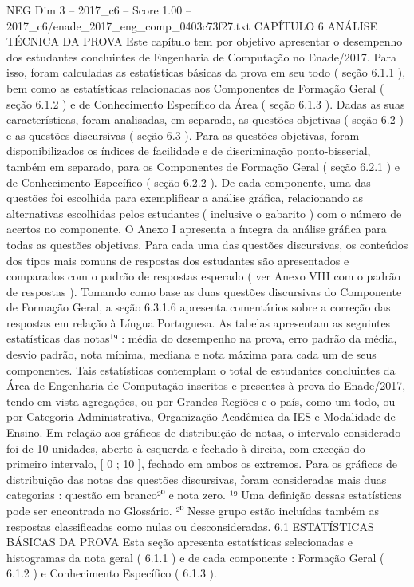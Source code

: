 \begin{textsample}{NEG Dim 3 – 2017\_c6 – Score 1.00 – 2017\_c6/enade\_2017\_eng\_comp\_0403c73f27.txt}  \label{ex:f3_neg_088}
CAPÍTULO 6 ANÁLISE TÉCNICA DA PROVA Este capítulo tem por objetivo apresentar o desempenho dos estudantes concluintes de Engenharia de Computação no Enade/2017.
Para isso, foram calculadas as estatísticas básicas da prova em seu todo ( seção 6.1.1 ), bem como as estatísticas relacionadas aos Componentes de Formação Geral ( seção 6.1.2 ) e de Conhecimento Específico da Área ( seção 6.1.3 ).
Dadas as suas características, foram analisadas, em separado, as questões objetivas ( seção 6.2 ) e as questões discursivas ( seção 6.3 ).
Para as questões objetivas, foram disponibilizados os índices de facilidade e de discriminação ponto-bisserial, também em separado, para os Componentes de Formação Geral ( seção 6.2.1 ) e de Conhecimento Específico ( seção 6.2.2 ).
De cada componente, uma das questões foi escolhida para exemplificar a análise gráfica, relacionando as alternativas escolhidas pelos estudantes ( inclusive o gabarito ) com o número de acertos no componente.
O Anexo I apresenta a íntegra da análise gráfica para todas as questões objetivas.
Para cada uma das questões discursivas, os conteúdos dos tipos mais comuns de respostas dos estudantes são apresentados e comparados com o padrão de respostas esperado ( ver Anexo VIII com o padrão de respostas ).
Tomando como base as duas questões discursivas do Componente de Formação Geral, a seção 6.3.1.6 apresenta comentários sobre a correção das respostas em relação à Língua Portuguesa.
As tabelas apresentam as seguintes estatísticas das notas¹⁹ : média do desempenho na prova, erro padrão da média, desvio padrão, nota mínima, mediana e nota máxima para cada um de seus componentes.
Tais estatísticas contemplam o total de estudantes concluintes da Área de Engenharia de Computação inscritos e presentes à prova do Enade/2017, tendo em vista agregações, ou por Grandes Regiões e o país, como um todo, ou por Categoria Administrativa, Organização Acadêmica da IES e Modalidade de Ensino.
Em relação aos gráficos de distribuição de notas, o intervalo considerado foi de 10 unidades, aberto à esquerda e fechado à direita, com exceção do primeiro intervalo, [ 0 ; 10 ], fechado em ambos os extremos.
Para os gráficos de distribuição das notas das questões discursivas, foram consideradas mais duas categorias : questão em branco²⁰ e nota zero. ¹⁹ Uma definição dessas estatísticas pode ser encontrada no Glossário. ²⁰ Nesse grupo estão incluídas também as respostas classificadas como nulas ou desconsideradas. 6.1 ESTATÍSTICAS BÁSICAS DA PROVA Esta seção apresenta estatísticas selecionadas e histogramas da nota geral ( 6.1.1 ) e de cada componente : Formação Geral ( 6.1.2 ) e Conhecimento Específico ( 6.1.3 ).

\end{textsample}
